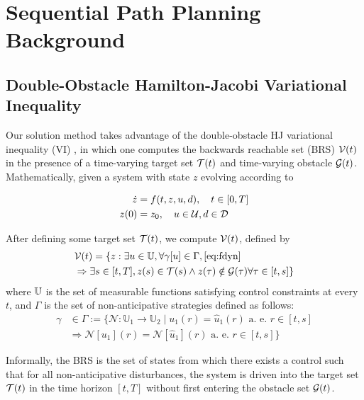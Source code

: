 \section{Sequential Path Planning Background \label{sec:SPP}}
\subsection{Double-Obstacle Hamilton-Jacobi Variational Inequality}
Our solution method takes advantage of the double-obstacle HJ variational inequality (VI) \cite{Fisac15}, in which one computes the backwards reachable set (BRS) $\mathcal{V}(t)$ in the presence of a time-varying target set $\mathcal{T}(t)$ and time-varying obstacle $\mathcal{G}(t)$. Mathematically, given a system with state $z$ evolving according to

\begin{equation}
\label{eq:fdyn} %
\begin{aligned}
\dot{z} &= f(t, z, u, d), \quad t \in [0, T] \\
z(0) &= z_0, \quad u \in \cset, d \in \dset
\end{aligned}
\end{equation}

After defining some target set $\mathcal{T}(t)$, we compute $\mathcal{V}(t)$, defined by 
%
\begin{equation}
\label{eq:brs}
\begin{aligned}
&\mathcal{V}(t) = \{z: \exists u \in \mathbb{U}, \forall \gamma[u] \in \Gamma, \eqref{eq:fdyn} \\
&\Rightarrow \exists s \in [t, T], z(s) \in \mathcal{T}(s) \wedge z(\tau) \notin \mathcal{G}(\tau) \forall \tau \in [t, s]\}
\end{aligned}
\end{equation}
%
\noindent where $\mathbb{U}$ is the set of measurable functions satisfying control constraints at every $t$, and $\Gamma$ is the set of non-anticipative strategies \cite{Mitchell05} defined as follows:
\begin{equation}
\begin{aligned}
\gamma &\in \Gamma := \{\mathcal{N}: \mathbb{U}_1 \rightarrow \mathbb{U}_2 \mid  u_1(r) = \hat{u}_1(r) \text{ a. e. } r\in[t,s] \\
& \Rightarrow \mathcal{N}[u_1](r) = \mathcal{N}[\hat{u}_1](r) \text{ a. e. } r\in[t,s]\}
\end{aligned}
\end{equation}

Informally, the BRS is the set of states from which there exists a control such that for all non-anticipative disturbances, the system is driven into the target set $\mathcal{T}(t)$ in the time horizon $[t, T]$ without first entering the obstacle set $\mathcal{G}(t)$.

